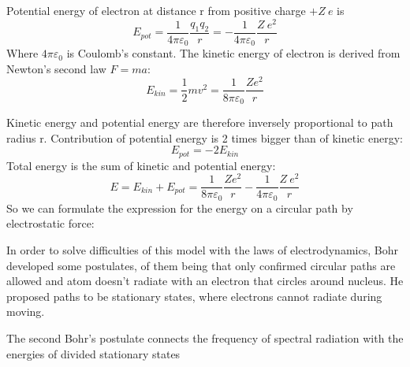 \documentclass{report}
\begin{document}
Potential energy of electron at distance r from positive charge $+Z\ e$ is
\begin{equation}
    E_{pot} = \frac{1}{4\pi \varepsilon_0} \frac{q_1 q_2}{r} = -\frac{1}{4\pi \varepsilon_0} \frac{Z \ e^2}{r}
\end{equation}
Where $4 \pi \varepsilon_0$ is Coulomb's constant. The kinetic energy of electron is derived from Newton's second law $F = ma$:
\begin{equation}
    E_{kin} = \frac{1}{2} m v^2 = \frac{1}{8\pi \varepsilon_0} \frac{Ze^2}{r}
\end{equation}

Kinetic energy and potential energy are therefore inversely proportional to path radius r. Contribution of potential energy is 2 times bigger than of kinetic energy:
\begin{equation}
    E_{pot} = -2E_{kin}
\end{equation}
Total energy is the sum of kinetic and potential energy:
\[E = E_{kin} + E_{pot} = \frac{1}{8\pi \varepsilon_0} \frac{Ze^2}{r} -\frac{1}{4\pi \varepsilon_0} \frac{Z \ e^2}{r}\]
So we can formulate the expression for the energy on a circular path by electrostatic force:

In order to solve difficulties of this model with the laws of electrodynamics, Bohr developed some postulates, of them being that only confirmed circular paths are allowed and atom doesn't radiate with an electron that circles around nucleus. He proposed paths to be stationary states, where electrons cannot radiate during moving.


The second Bohr's postulate connects the frequency of spectral radiation with the energies of divided stationary states
\end{document}
